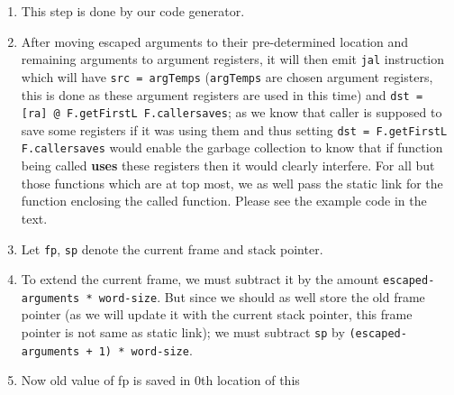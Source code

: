 \begin{enumerate}
	      \begin{enumerate}
		      \def\labelenumii{\arabic{enumii}.}
		      \item
		            This step is done by our code generator.
		      \item
		            After moving escaped arguments to their pre-determined location and
		            remaining arguments to argument registers, it will then emit
		            \texttt{jal}
		            instruction which will have
		            \texttt{src = argTemps}
		            (\texttt{argTemps}
		            are chosen argument registers, this is done as these argument
		            registers are used in this time) and
		            \texttt{dst = [ra] @ F.getFirstL F.callersaves};
		            as we know that caller is supposed to save some registers if it was
		            using them and thus setting
		            \texttt{dst = F.getFirstL F.callersaves}
		            would enable the garbage collection to know that if function being
		            called \textbf{uses} these registers then it would clearly
		            interfere. For all but those functions which are at top most, we as well pass the static link for the function enclosing the called function. Please see the example code in the text.
		      \item
		            Let
		            \texttt{fp},
		            \texttt{sp}
		            denote the current frame and stack pointer.
		      \item
		            To extend the current frame, we must subtract it by the amount
		            \texttt{escaped-arguments * word-size}.
		            But since we should as well store the old frame pointer (as we will
		            update it with the current stack pointer, this frame pointer is not same as static link); we must subtract
		            \texttt{sp}
		            by
		            \texttt{(escaped-arguments + 1) * word-size}.
		      \item
		            Now old value of fp is saved in 0th location of this

\end{enumerate}
\end{enumerate}
